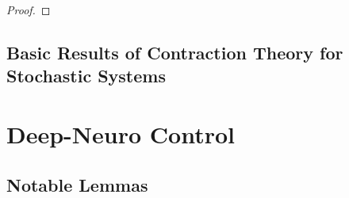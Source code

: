 \documentclass{article}
\newcommand*{\template}{../dding_template}
\begin{document}
\begin{proof}

\end{proof}

\subsection{Basic Results of Contraction Theory for Stochastic Systems}

\section{Deep-Neuro Control}


\begin{appendices}

\section{Notable Lemmas}

\end{appendices}



\end{document}
